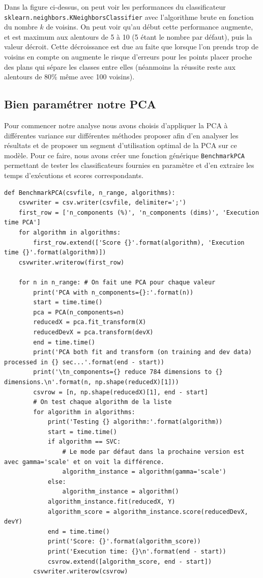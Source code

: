 \documentclass[12pt,a4paper]{article}
\begin{document}
{Dans la figure ci-dessus, on peut voir les performances du classificateur \lstinline[style=default]|sklearn.neighbors.KNeighborsClassifier| avec l'algorithme brute en fonction du nombre $k$ de voisins. On peut voir qu'au début cette performance augmente, et est maximum aux alentours de 5 à 10 (5 étant le nombre par défaut), puis la valeur décroit. Cette décroissance est due au faite que lorsque l'on prends trop de voisins en compte on augmente le risque d'erreurs pour les points placer proche des plans qui sépare les classes entre elles (néanmoins la réussite reste aux alentours de 80\% même avec 100 voisins).

\newpage

\subsection{Bien paramétrer notre PCA}

Pour commencer notre analyse nous avons choisis d'appliquer la PCA à différentes variance sur différentes méthodes proposer afin d'en analyser les résultats et de proposer un segment d'utilisation optimal de la PCA sur ce modèle. Pour ce faire, nous avons créer une fonction générique \lstinline[style=default]|BenchmarkPCA| permettant de tester les classificateurs fournies en paramètre et d'en extraire les temps d'exécutions et scores correspondants.
\begin{lstlisting}[style=darkula]
def BenchmarkPCA(csvfile, n_range, algorithms):
	csvwriter = csv.writer(csvfile, delimiter=';')
	first_row = ['n_components (%)', 'n_components (dims)', 'Execution time PCA']
	for algorithm in algorithms:
		first_row.extend(['Score {}'.format(algorithm), 'Execution time {}'.format(algorithm)])
	csvwriter.writerow(first_row)

	for n in n_range: # On fait une PCA pour chaque valeur
		print('PCA with n_components={}:'.format(n))
		start = time.time()
		pca = PCA(n_components=n)
		reducedX = pca.fit_transform(X)
		reducedDevX = pca.transform(devX)
		end = time.time()
		print('PCA both fit and transform (on training and dev data) processed in {} sec...'.format(end - start))
		print('\tn_components={} reduce 784 dimensions to {} dimensions.\n'.format(n, np.shape(reducedX)[1]))
		csvrow = [n, np.shape(reducedX)[1], end - start]
		# On test chaque algorithm de la liste
		for algorithm in algorithms: 
			print('Testing {} algorithm:'.format(algorithm))
			start = time.time()
			if algorithm == SVC:
				# Le mode par défaut dans la prochaine version est avec gamma='scale' et on voit la différence.
				algorithm_instance = algorithm(gamma='scale')
			else:
				algorithm_instance = algorithm()
			algorithm_instance.fit(reducedX, Y)
			algorithm_score = algorithm_instance.score(reducedDevX, devY)
			end = time.time()
			print('Score: {}'.format(algorithm_score))
			print('Execution time: {}\n'.format(end - start))
			csvrow.extend([algorithm_score, end - start])
		csvwriter.writerow(csvrow)
\end{lstlisting}

}
\end{document}
